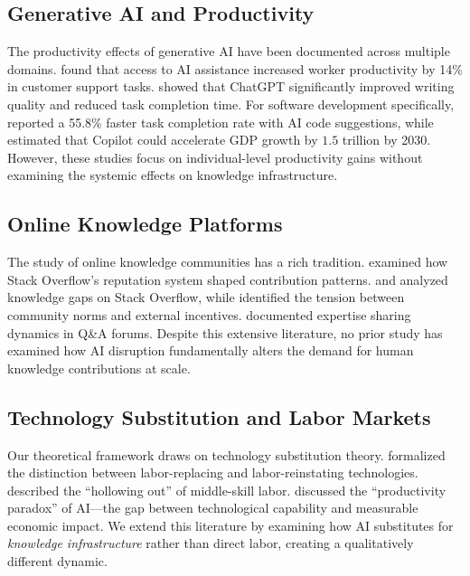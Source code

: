\documentclass[11pt,a4paper]{article}
\begin{document}
\subsection{Generative AI and Productivity}

The productivity effects of generative AI have been documented across multiple domains. \citet{brynjolfsson2023} found that access to AI assistance increased worker productivity by 14\% in customer support tasks. \citet{noy2023} showed that ChatGPT significantly improved writing quality and reduced task completion time. For software development specifically, \citet{peng2023} reported a 55.8\% faster task completion rate with AI code suggestions, while \citet{dohmke2023} estimated that Copilot could accelerate GDP growth by $1.5$ trillion by 2030. However, these studies focus on individual-level productivity gains without examining the systemic effects on knowledge infrastructure.

\subsection{Online Knowledge Platforms}

The study of online knowledge communities has a rich tradition. \citet{mamykina2011} examined how Stack Overflow's reputation system shaped contribution patterns. \citet{treude2011} and \citet{kabir2019} analyzed knowledge gaps on Stack Overflow, while \citet{fischer2015} identified the tension between community norms and external incentives. \citet{adamic2008} documented expertise sharing dynamics in Q\&A forums. Despite this extensive literature, no prior study has examined how AI disruption fundamentally alters the demand for human knowledge contributions at scale.

\subsection{Technology Substitution and Labor Markets}

Our theoretical framework draws on technology substitution theory. \citet{acemoglu2019} formalized the distinction between labor-replacing and labor-reinstating technologies. \citet{autor2015} described the ``hollowing out'' of middle-skill labor. \citet{brynjolfsson2017} discussed the ``productivity paradox'' of AI---the gap between technological capability and measurable economic impact. We extend this literature by examining how AI substitutes for \textit{knowledge infrastructure} rather than direct labor, creating a qualitatively different dynamic.
\end{document}
